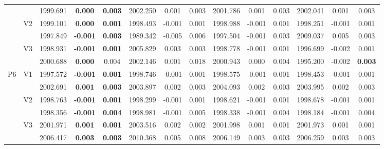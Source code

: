 \documentclass[12pt,a4paper]{article}
\begin{document}
\begin{sidewaystable}[ht]
{\begin{tabular}{cc|ccc|ccc|ccc|ccc|}
   &  & 1999.691 & \textbf{0.000} & \textbf{0.003} & 2002.250 & 0.001 & 0.003 & 2001.786 & 0.001 & 0.003 & 2002.041 & 0.001 & 0.003 \\ 
   & \multirow{2}{*}{V2} & 1999.101 & \textbf{0.000} & \textbf{0.001} & 1998.493 & -0.001 & 0.001 & 1998.988 & -0.001 & 0.001 & 1998.251 & -0.001 & 0.001 \\ 
   &  & 1997.849 & \textbf{-0.001} & \textbf{0.003} & 1989.342 & -0.005 & 0.006 & 1997.504 & -0.001 & 0.003 & 2009.037 & 0.005 & 0.003 \\ 
   & \multirow{2}{*}{V3} & 1998.931 & \textbf{-0.001} & \textbf{0.001} & 2005.829 & 0.003 & 0.003 & 1998.778 & -0.001 & 0.001 & 1996.699 & -0.002 & 0.001 \\ 
   &  & 2000.688 & \textbf{0.000} & 0.004 & 2002.146 & 0.001 & 0.018 & 2000.943 & 0.000 & 0.004 & 1995.200 & -0.002 & \textbf{0.003} \\ 
   \hline \hline\multirow{6}{*}{P6} & \multirow{2}{*}{V1} & 1997.572 & \textbf{-0.001} & \textbf{0.001} & 1998.746 & -0.001 & 0.001 & 1998.575 & -0.001 & 0.001 & 1998.453 & -0.001 & 0.001 \\ 
   &  & 2002.691 & \textbf{0.001} & \textbf{0.003} & 2003.897 & 0.002 & 0.003 & 2004.093 & 0.002 & 0.003 & 2003.995 & 0.002 & 0.003 \\ 
   & \multirow{2}{*}{V2} & 1998.763 & \textbf{-0.001} & \textbf{0.001} & 1998.299 & -0.001 & 0.001 & 1998.621 & -0.001 & 0.001 & 1998.678 & -0.001 & 0.001 \\ 
   &  & 1998.356 & \textbf{-0.001} & \textbf{0.004} & 1998.981 & -0.001 & 0.005 & 1998.338 & -0.001 & 0.004 & 1998.184 & -0.001 & 0.004 \\ 
   & \multirow{2}{*}{V3} & 2001.971 & \textbf{0.001} & \textbf{0.001} & 2003.516 & 0.002 & 0.002 & 2001.998 & 0.001 & 0.001 & 2001.973 & 0.001 & 0.001 \\ 
   &  & 2006.417 & \textbf{0.003} & \textbf{0.003} & 2010.368 & 0.005 & 0.008 & 2006.149 & 0.003 & 0.003 & 2006.259 & 0.003 & 0.003 \\ 
   \hline
\end{tabular}
}
\end{sidewaystable}
\end{document}
